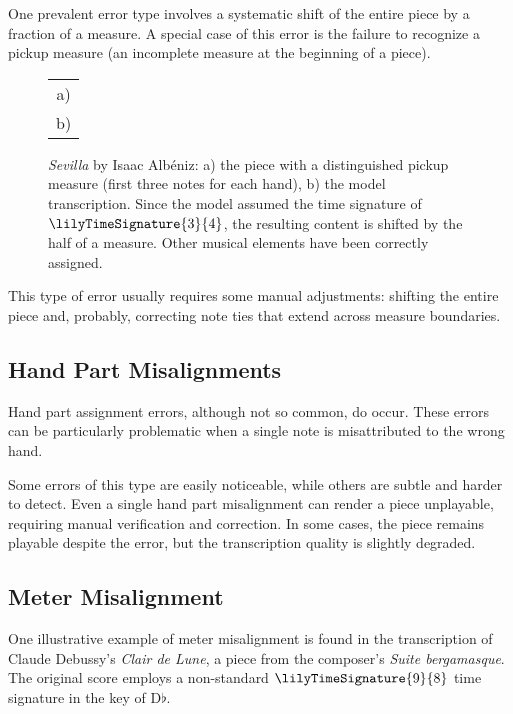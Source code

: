 One prevalent error type involves a systematic shift of the entire piece by a fraction of a measure. A special case of this error is the failure to recognize a pickup measure (an incomplete measure at the beginning of a piece).

\begin{figure}[ht!]
\centering
\begin{tabular}{c}a)
 \\ b)

\end{tabular}
\caption[\emph{Sevilla} by Isaac Albéniz.]{\emph{Sevilla} by Isaac Albéniz: a) the piece with a distinguished pickup measure (first three notes for each hand), b) the model transcription. Since the model assumed the time signature of $\lilyTimeSignature{3}{4}$, the resulting content is shifted by the half of a measure. Other musical elements have been correctly assigned.}
\label{albeniz}
\end{figure}

This type of error usually requires some manual adjustments: shifting the entire piece and, probably, correcting note ties that extend across measure boundaries.

\subsection{Hand Part Misalignments}

Hand part assignment errors, although not so common, do occur. These errors can be particularly problematic when a single note is misattributed to the wrong hand.

Some errors of this type are easily noticeable, while others are subtle and harder to detect. Even a single hand part misalignment can render a piece unplayable, requiring manual verification and correction. In some cases, the piece remains playable despite the error, but the transcription quality is slightly degraded.

\subsection{Meter Misalignment}\label{meter_misalignment}

One illustrative example of meter misalignment is found in the transcription of Claude Debussy’s \emph{Clair de Lune}, a piece from the composer’s \emph{Suite bergamasque}. The original score employs a non-standard $\lilyTimeSignature{9}{8}$ time signature in the key of D$\flat$.

